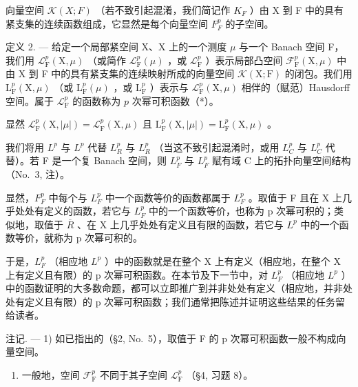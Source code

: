 向量空间 \(\mathcal{K}(X;F)\) （若不致引起混淆，我们简记作 \(K_{F}\) ）由 X 到 F 中的具有紧支集的连续函数组成，它显然是每个向量空间 \(F_{F}^{p}\) 的子空间。

定义 2. --- 给定一个局部紧空间 X、X 上的一个测度 \(\mu\) 与一个 Banach 空间 F，我们用 \(\mathcal{L}_{\mathrm{F}}^{p}(\mathrm{X},\mu)\) （或简作 \(\mathcal{L}_{\mathrm{F}}^{p}(\mu)\) ，或 \(\mathcal{L}_{\mathrm{F}}^{p}\) ）表示局部凸空间 \(\mathcal{F}_{\mathrm{F}}^{p}(\mathrm{X},\mu)\) 中由 X 到 F 中的具有紧支集的连续映射所成的向量空间 \(\mathcal{K}(\mathrm{X};\mathrm{F})\) 的闭包。我们用 \(\mathrm{L}_{\mathrm{F}}^{p}(\mathrm{X},\mu)\) （或 \(\mathrm{L}_{\mathrm{F}}^{p}(\mu)\) ，或 \(\mathrm{L}_{\mathrm{F}}^{p}\) ）表示与 \(\mathcal{L}_{\mathrm{F}}^{p}(\mathrm{X},\mu)\) 相伴的（赋范）Hausdorff 空间。属于 \(\mathcal{L}_{\mathrm{F}}^{p}\) 的函数称为 \(p\) 次幂可积函数（*）。

显然 \(\mathcal{L}_{\mathrm{F}}^{p}(\mathrm{X},|\mu |) = \mathcal{L}_{\mathrm{F}}^{p}(\mathrm{X},\mu)\) 且 \(\mathrm{L}_{\mathrm{F}}^{p}(\mathrm{X},|\mu |) = \mathrm{L}_{\mathrm{F}}^{p}(\mathrm{X},\mu)\) 。

我们将用 \(L^{p}\) 与 \(L^{p}\) 代替 \(L_{R}^{p}\) 与 \(L_{R}^{p}\) （当这不致引起混淆时，或用 \(L_{C}^{p}\) 与 \(L_{C}^{p}\) 代替）。若 F 是一个复 Banach 空间，则 \(L_{F}^{p}\) 与 \(L_{F}^{p}\) 赋有域 C 上的拓扑向量空间结构（No.~3, 注）。

显然，\(F_{F}^{p}\) 中每个与 \(L_{F}^{p}\) 中一个函数等价的函数都属于 \(L_{F}^{p}\) 。取值于 F 且在 X 上几乎处处有定义的函数，若它与 \(L_{F}^{p}\) 中的一个函数等价，也称为 p 次幂可积的；类似地，取值于 \(\overline{R}\) 、在 X 上几乎处处有定义且有限的函数，若它与 \(L^{p}\) 中的一个函数等价，就称为 p 次幂可积的。

于是，\(L_{F}^{p}\) （相应地 \(L^{p}\) ）中的函数就是在整个 X 上有定义（相应地，在整个 X 上有定义且有限）的 p 次幂可积函数。在本节及下一节中，对 \(L_{F}^{p}\) （相应地 \(L^{p}\) ）中的函数证明的大多数命题，都可以立即推广到并非处处有定义（相应地，并非处处有定义且有限）的 p 次幂可积函数；我们通常把陈述并证明这些结果的任务留给读者。

注记. --- 1) 如已指出的（§2, No.~5），取值于 F 的 p 次幂可积函数一般不构成向量空间。

\begin{enumerate}
\def\labelenumi{\arabic{enumi})}
\setcounter{enumi}{1}
\tightlist
\item
  一般地，空间 \(\mathcal{F}_{\mathrm{F}}^{p}\) 不同于其子空间 \(\mathcal{L}_{\mathrm{F}}^{p}\) （§4, 习题 8）。
\end{enumerate}

